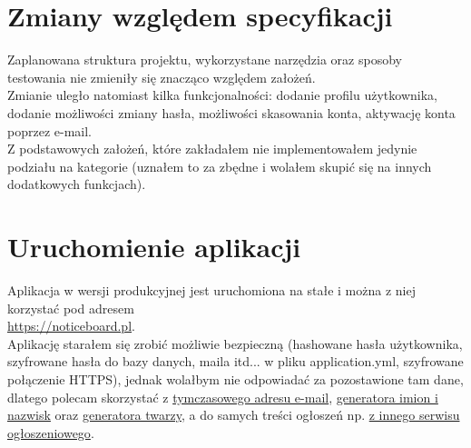 \documentclass{article}
\begin{document}
\section{Zmiany względem specyfikacji}
    Zaplanowana struktura projektu, wykorzystane narzędzia oraz sposoby testowania nie zmieniły się znacząco względem założeń. \\
    
    Zmianie uległo natomiast kilka funkcjonalności: dodanie profilu użytkownika, dodanie możliwości zmiany hasła, możliwości skasowania konta, aktywację konta poprzez e-mail. \\

    Z podstawowych założeń, które zakładałem nie implementowałem jedynie podziału na kategorie (uznałem to za zbędne i wolałem skupić się na innych dodatkowych funkcjach).
\section{Uruchomienie aplikacji}
    Aplikacja w wersji produkcyjnej jest uruchomiona na stałe i można z niej korzystać pod adresem \\ \href{https://noticeboard.pl}{https://noticeboard.pl}. \\
    Aplikację starałem się zrobić możliwie bezpieczną (hashowane hasła użytkownika, szyfrowane hasła do bazy danych, maila itd... w pliku application.yml, szyfrowane połączenie HTTPS), jednak wolałbym nie odpowiadać za pozostawione tam dane, dlatego polecam skorzystać z \href{https://temp-mail.org/en/}{tymczasowego adresu e-mail}, \href{https://random-data-generator.com/generator-losowych-imion-i-nazwisk/}{generatora imion i nazwisk} oraz \href{https://thispersondoesnotexist.com/}{generatora twarzy}, a do samych treści ogłoszeń np. \href{https://olx.pl}{z innego serwisu ogłoszeniowego}.\\
    
\end{document}

